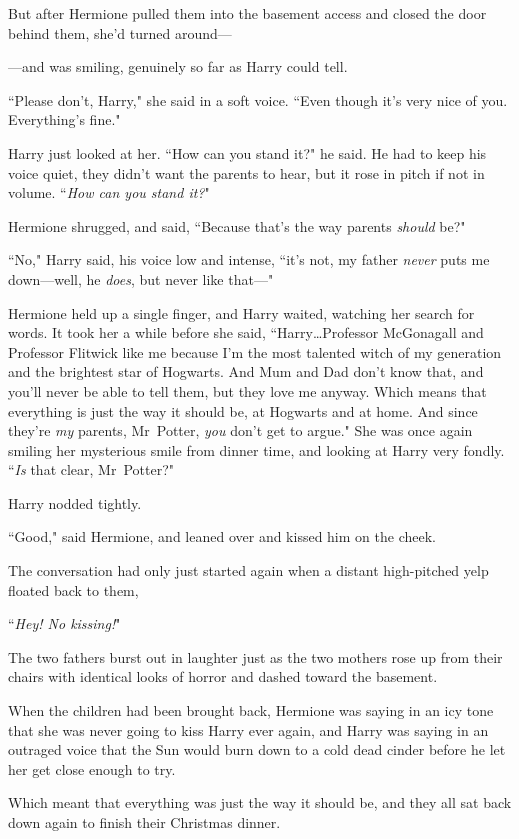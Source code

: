 But after Hermione pulled them into the basement access and closed the door behind them, she'd turned around—

—and was smiling, genuinely so far as Harry could tell.

``Please don't, Harry," she said in a soft voice. ``Even though it's very nice of you. Everything's fine."

Harry just looked at her. ``How can you stand it?" he said. He had to keep his voice quiet, they didn't want the parents to hear, but it rose in pitch if not in volume. ``\emph{How can you stand it?}"

Hermione shrugged, and said, ``Because that's the way parents \emph{should} be?"

``No," Harry said, his voice low and intense, ``it's not, my father \emph{never} puts me down—well, he \emph{does}, but never like that—"

Hermione held up a single finger, and Harry waited, watching her search for words. It took her a while before she said, ``Harry…Professor McGonagall and Professor Flitwick like me because I'm the most talented witch of my generation and the brightest star of Hogwarts. And Mum and Dad don't know that, and you'll never be able to tell them, but they love me anyway. Which means that everything is just the way it should be, at Hogwarts and at home. And since they're \emph{my} parents, Mr~Potter, \emph{you} don't get to argue." She was once again smiling her mysterious smile from dinner time, and looking at Harry very fondly. ``\emph{Is} that clear, Mr~Potter?"

Harry nodded tightly.

``Good," said Hermione, and leaned over and kissed him on the cheek.

\later

The conversation had only just started again when a distant high-pitched yelp floated back to them,

``\emph{Hey! No kissing!}"

The two fathers burst out in laughter just as the two mothers rose up from their chairs with identical looks of horror and dashed toward the basement.

When the children had been brought back, Hermione was saying in an icy tone that she was never going to kiss Harry ever again, and Harry was saying in an outraged voice that the Sun would burn down to a cold dead cinder before he let her get close enough to try.

Which meant that everything was just the way it should be, and they all sat back down again to finish their Christmas dinner.

